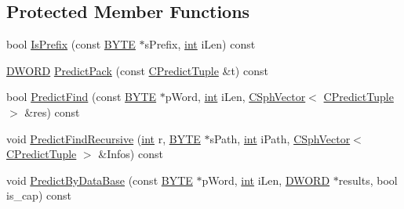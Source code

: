 \subsection*{Protected Member Functions}
\begin{DoxyCompactItemize}
\item 
bool \hyperlink{classCLemmatizer_a0b1ae0e81bc26748b0d48e3c2088542c}{Is\-Prefix} (const \hyperlink{sphinxstd_8h_a4ae1dab0fb4b072a66584546209e7d58}{B\-Y\-T\-E} $\ast$s\-Prefix, \hyperlink{sphinxexpr_8cpp_a4a26e8f9cb8b736e0c4cbf4d16de985e}{int} i\-Len) const 
\item 
\hyperlink{sphinxstd_8h_a798af1e30bc65f319c1a246cecf59e39}{D\-W\-O\-R\-D} \hyperlink{classCLemmatizer_ab45819832a6e9433ad29596dbd07a929}{Predict\-Pack} (const \hyperlink{structCPredictTuple}{C\-Predict\-Tuple} \&t) const 
\item 
bool \hyperlink{classCLemmatizer_a5bf62c7b061e504ce71c791f824d0297}{Predict\-Find} (const \hyperlink{sphinxstd_8h_a4ae1dab0fb4b072a66584546209e7d58}{B\-Y\-T\-E} $\ast$p\-Word, \hyperlink{sphinxexpr_8cpp_a4a26e8f9cb8b736e0c4cbf4d16de985e}{int} i\-Len, \hyperlink{classCSphVector}{C\-Sph\-Vector}$<$ \hyperlink{structCPredictTuple}{C\-Predict\-Tuple} $>$ \&res) const 
\item 
void \hyperlink{classCLemmatizer_af08fa9256329696acf75a50b85f13b96}{Predict\-Find\-Recursive} (\hyperlink{sphinxexpr_8cpp_a4a26e8f9cb8b736e0c4cbf4d16de985e}{int} r, \hyperlink{sphinxstd_8h_a4ae1dab0fb4b072a66584546209e7d58}{B\-Y\-T\-E} $\ast$s\-Path, \hyperlink{sphinxexpr_8cpp_a4a26e8f9cb8b736e0c4cbf4d16de985e}{int} i\-Path, \hyperlink{classCSphVector}{C\-Sph\-Vector}$<$ \hyperlink{structCPredictTuple}{C\-Predict\-Tuple} $>$ \&Infos) const 
\item 
void \hyperlink{classCLemmatizer_a78ad2f07ff8a6e36948a5dfc47010ac4}{Predict\-By\-Data\-Base} (const \hyperlink{sphinxstd_8h_a4ae1dab0fb4b072a66584546209e7d58}{B\-Y\-T\-E} $\ast$p\-Word, \hyperlink{sphinxexpr_8cpp_a4a26e8f9cb8b736e0c4cbf4d16de985e}{int} i\-Len, \hyperlink{sphinxstd_8h_a798af1e30bc65f319c1a246cecf59e39}{D\-W\-O\-R\-D} $\ast$results, bool is\-\_\-cap) const 
\end{DoxyCompactItemize}
